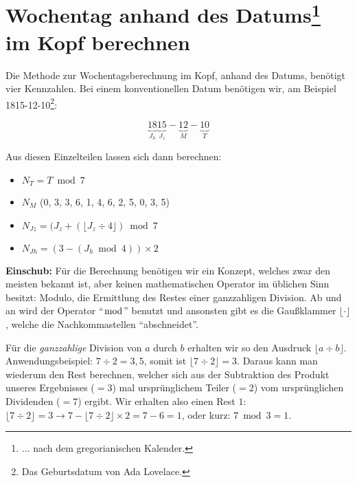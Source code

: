 \documentclass[version=last,paper=A4,fontsize=11pt,DIV=18]{scrartcl}
\newenvironment{nscenter}
{\parskip=0pt\par\nopagebreak\centering}
{\par\noindent\ignorespacesafterend}
\begin{document}
\section*{Wochentag anhand des Datums\footnote{... nach dem gregorianischen Kalender.} im Kopf berechnen}

Die Methode zur Wochentagsberechnung im Kopf, anhand des Datums, benötigt vier Kennzahlen. Bei einem konventionellen Datum benötigen wir, am Beispiel 1815-12-10\footnote{Das Geburtsdatum von Ada Lovelace.}:

\begin{framed}
\begin{nscenter}
    \[\underbrace{18}_{J_h}\underbrace{15}_{J_z}-\underbrace{12}_{M}-\underbrace{10}_{T}\]
\end{nscenter}

Aus diesen Einzelteilen lassen sich dann berechnen:

\begin{itemize}
    \item {} $N_T = T \bmod 7$
    \item {} $N_M$ (0, 3, 3, 6, 1, 4, 6, 2, 5, 0, 3, 5)
    \item {} $N_{Jz} = (J_z + (\lfloor J_z \div 4 \rfloor) \bmod 7$
    \item {} $N_{Jh} = (3 - (J_h \bmod 4)) \times 2$
\end{itemize}
\end{framed}

\begin{framed}
\textbf{Einschub:} Für die Berechnung benötigen wir ein Konzept, welches zwar den meisten bekannt ist, aber keinen mathematischen Operator im üblichen Sinn besitzt: Modulo, die Ermittlung des Restes einer ganzzahligen Division. Ab und an wird der Operator \enquote{$\bmod$} benutzt und ansonsten gibt es die Gaußklammer $\lfloor \cdot \rfloor$, welche die Nachkommastellen \enquote{abschneidet}.

Für die \emph{ganzzahlige} Division von $a$ durch $b$ erhalten wir so den Ausdruck $\lfloor a \div b \rfloor$. Anwendungsbeispiel: $7 \div 2 = 3,5$, somit ist $\lfloor 7 \div 2 \rfloor = 3$. Daraus kann man wiederum den Rest berechnen, welcher sich aus der Subtraktion des Produkt unseres Ergebnisses ($= 3$) mal ursprünglichem Teiler ($= 2$) vom ursprünglichen Dividenden ($= 7$) ergibt. Wir erhalten also einen Rest $1$: $\lfloor 7 \div 2 \rfloor = 3 \rightarrow 7 - \lfloor 7 \div 2 \rfloor \times 2 = 7 - 6 = 1$, oder kurz: $7 \bmod 3 = 1$.
\end{framed}
\end{document}
